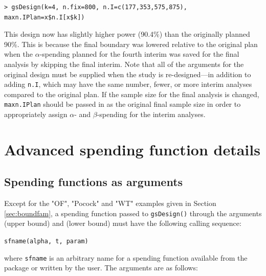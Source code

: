 \bigskip
\begin{verbatim}
> gsDesign(k=4, n.fix=800, n.I=c(177,353,575,875), maxn.IPlan=x$n.I[x$k])
\end{verbatim}

\bigskip

This design now has slightly higher power (90.4\%) than the originally planned
90\%. This is because the final boundary was lowered relative to the original
plan when the $\alpha$-spending planned for the fourth interim was saved
for the final analysis by skipping the final interim. Note that all of the
arguments for the original design must be supplied when the study is
re-designed---in addition to adding \texttt{n.I}, which may have the same
number, fewer, or more interim analyses compared to the original plan. If the
sample size for the final analysis is changed, \texttt{maxn.IPlan} should be
passed in as the original final sample size in order to appropriately assign
$\alpha$- and $\beta$-spending for the interim analyses.


\section{Advanced spending function details\label{sec:sfDetails}}
\subsection{Spending functions as arguments\label{sec:sfArgs}}
Except for the "OF", "Pocock" and "WT" examples given in Section \ref{sec:boundfam}, a spending function passed to \texttt{gsDesign()} through the arguments  (upper bound) and  (lower bound) must have the following calling sequence:

\bigskip

\texttt{sfname(alpha, t, param)}

\bigskip

where \texttt{sfname} is an arbitrary name for a spending function available
from the package or written by the user. The arguments are as follows:

